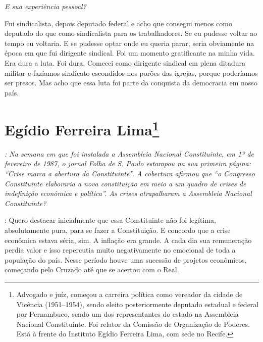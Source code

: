 \medskip

\noindent\emph{E sua experiência pessoal?}

Fui sindicalista, depois deputado federal e acho
que consegui menos como deputado do que como sindicalista para os
trabalhadores. Se eu pudesse voltar ao tempo eu voltaria. E se pudesse
optar onde eu queria parar, seria obviamente na época em que fui
dirigente sindical. Foi um momento gratificante na minha vida. Era dura
a luta. Foi dura. Comecei como dirigente sindical em plena ditadura
militar e fazíamos sindicato escondidos nos porões das igrejas, porque
poderíamos ser presos. Mas acho que essa luta foi parte da conquista da
democracia em nosso país.

\chapter{Egídio Ferreira Lima\footnote{Advogado e juíz, começou a carreira política como vereador da cidade de
Vicência (1951--1954), sendo eleito posteriormente deputado estadual e
federal por Pernambuco, sendo um dos representantes do estado na
Assembleia Nacional Constituinte. Foi relator da Comissão de Organização
de Poderes. Está à frente do Instituto Egídio Ferreira Lima, com sede no
Recife.}}

\emph{: Na semana em que foi instalada a Assembleia Nacional
Constituinte, em 1º de fevereiro de 1987, o jornal \emph{Folha de S. Paulo}
estampou na sua primeira página: ``Crise marca a abertura da
Constituinte''. A cobertura afirmou que ``o Congresso Constituinte
elaboraria a nova constituição em meio a um quadro de crises de
indefinição econômica e política''. As crises atrapalharam a Assembleia
Nacional Constituinte?}

: Quero destacar inicialmente que essa Constituinte não
foi legítima, absolutamente pura, para se fazer a Constituição. E
concordo que a crise econômica estava séria, sim. A inflação era grande.
A cada dia sua remuneração perdia valor e isso repercutia muito
negativamente no emocional de toda a população do país. Nesse período
houve uma sucessão de projetos econômicos, começando pelo Cruzado até
que se acertou com o Real.

